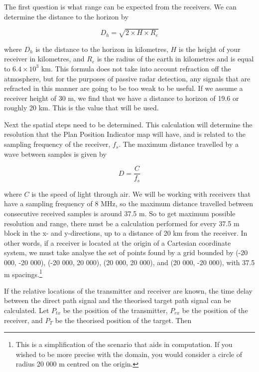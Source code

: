 \documentclass[12pt,openany,a4paper]{book}
\begin{document}
\bigskip

The first question is what range can be expected from the receivers. We can determine the distance to the horizon by \cite{RHB}

\begin{equation}
D_{h} = \sqrt{2 \times H \times R_{e}}
\end{equation}

\bigskip

where $D_{h}$ is the distance to the horizon in kilometres, $H$ is the height of your receiver in kilometres, and $R_{e}$ is the radius of the earth in kilometres and is equal to $6.4\times 10^{3}$ km. This formula does not take into account refraction off the atmosphere, but for the purposes of passive radar detection, any signals that are refracted in this manner are going to be too weak to be useful. If we assume a receiver height of 30 m, we find that we have a distance to horizon of 19.6 or roughly 20 km. This is the value that will be used.

\bigskip

Next the spatial steps need to be determined. This calculation will determine the resolution that the Plan Position Indicator map will have, and is related to the sampling frequency of the receiver, $f_{s}$. The maximum distance travelled by a wave between samples is given by 

\begin{equation}
D = \frac{C}{f_{s}}
\end{equation}

\bigskip

where $C$ is the speed of light through air. We will be working with receivers that have a sampling frequency of 8 MHz, so the maximum distance travelled between consecutive received samples is around 37.5 m. So to get maximum possible resolution and range, there must be a calculation performed for every 37.5 m block in the x- and y-directions, up to a distance of 20 km from the receiver. In other words, if a receiver is located at the origin of a Cartesian coordinate system, we must take analyse the set of points found by a grid bounded by (-20 000, -20 000), (-20 000, 20 000), (20 000, 20 000), and (20 000, -20 000), with 37.5 m spacings.\footnote{This is a simplification of the scenario that aids in computation. If you wished to be more precise with the domain, you would consider a circle of radius 20 000 m centred on the origin.} 

\bigskip

If the relative locations of the transmitter and receiver are known, the time delay between the direct path signal and the theorised target path signal can be calculated. Let $P_{tx}$ be the position of the transmitter, $P_{rx}$ be the position of the receiver, and $P_{T}$ be the theorised position of the target. Then
\end{document}
